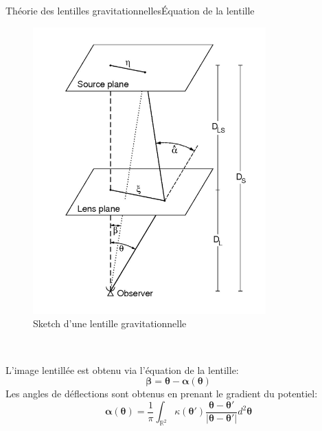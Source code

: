 \documentclass{beamer}
\begin{document}
\begin{frame}{Théorie des lentilles gravitationnelles}{Équation de la lentille}
\begin{minipage}{0.45\textwidth}
        \begin{figure}[H]
                \centering
                \includegraphics[width=0.8\textwidth]{lens_system_sketch}
                \caption{Sketch d'une lentille gravitationnelle \citet{Bartelmann2001}}
        \end{figure}
\end{minipage}
~
\begin{minipage}{0.5\textwidth}
L'image lentillée est obtenu via l'équation de la lentille:
\begin{equation}\label{eq:Lens Eq} 
        \boldsymbol{\beta} = \boldsymbol{\theta} - \boldsymbol{ \alpha}(\boldsymbol{ \theta} ) 
\end{equation} 
        Les angles de déflections sont obtenus en prenant le gradient du potentiel:
        \begin{equation}\label{eq:DeflectionAngles} 
                \boldsymbol{\alpha}(\boldsymbol{\theta}) 
                = \frac{1}{\pi}\int_{\mathbb{R}^2} \kappa(\boldsymbol{\theta}')
                \frac{\boldsymbol{\theta} -\boldsymbol{\theta}' }{
                |\boldsymbol{\theta} -\boldsymbol{\theta}' |}
                d^2\boldsymbol{\theta} 
        \end{equation} 
        
\end{minipage}
\end{frame}
\end{document}
